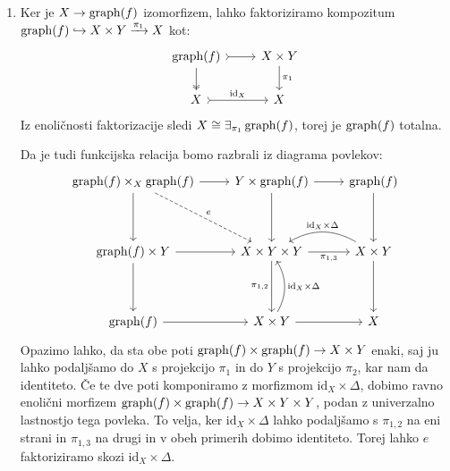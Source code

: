 \documentclass[../kategoricna_logika.tex]{subfiles}
\begin{document}
\begin{dokaz}
  \begin{enumerate}[label=(\roman*)]
  \item Ker je $X \to \operatorname{graph}(f)$ izomorfizem, lahko faktoriziramo
    kompozitum
    $\operatorname{graph}(f) \hookrightarrow X \times Y \xrightarrow{\pi_1} X$ kot:
    \begin{equation*}
      \begin{tikzcd}
        \operatorname{graph}(f) \ar[d, two heads] \ar[r, tail]  & X \times Y \ar[d, "\pi_1"] \\
        X \ar[r, tail, "\mathrm{id}_X"] & X
      \end{tikzcd}
    \end{equation*}
    Iz enoličnosti faktorizacije sledi
    $X \cong \exists_{\pi_1}\operatorname{graph}(f)$, torej je $\operatorname{graph}(f)$ totalna.

    Da je tudi funkcijska relacija bomo razbrali iz diagrama povlekov:
    \begin{equation*}
      \begin{tikzcd}[row sep=9ex]
        \graf(f) \times_X \graf(f) \ar[d] \ar[r] \ar[dr, dashed, "e"] &
        Y \times \graf(f) \ar[d] \ar[r] & \graf(f) \ar[d]\\
        \graf(f) \times Y \ar[d] \ar[r] & X \times Y \times Y \ar[d, "\pi_{1,2}"'] \ar[r, "\pi_{1,3}"'] &
        X \times Y \ar[d] \ar[l, bend right, " \mathrm{id}_X \times \Delta"'] \\
        \graf(f) \ar[r] & X \times Y \ar[u, bend right, " \mathrm{id}_X \times \Delta"'] \ar[r] & X
      \end{tikzcd}
    \end{equation*}
    Opazimo lahko, da sta obe poti $\operatorname{graph}(f) \times \operatorname{graph}(f) \to X \times Y$ enaki, saj ju lahko
    podaljšamo do $X$ s projekcijo $\pi_1$ in do $Y$ s projekcijo $\pi_2$, kar nam da identiteto.
    Če te dve poti komponiramo z morfizmom $\mathrm{id}_X \times \Delta$, dobimo ravno enolični morfizem
    $\operatorname{graph}(f) \times \operatorname{graph}(f) \to X \times Y \times Y$, podan z univerzalno lastnostjo tega povleka.
    To velja, ker $\mathrm{id}_X \times \Delta$ lahko podaljšamo s $\pi_{1,2}$ na eni strani in
    $\pi_{1,3}$ na drugi in v obeh primerih dobimo identiteto. Torej lahko $e$ faktoriziramo
    skozi $\mathrm{id}_X \times \Delta$.


\end{enumerate}
\end{dokaz}
\end{document}
